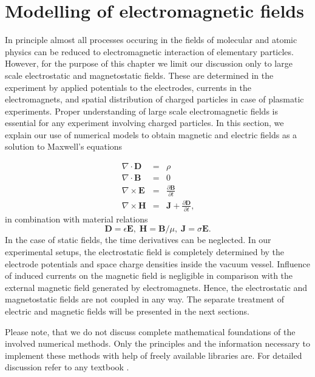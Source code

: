 
\chapter{Modelling of electromagnetic fields}

\label{ch:Modelling}In principle almost all processes occuring in
the fields of molecular and atomic physics can be reduced to electromagnetic
interaction of elementary particles. However, for the purpose of this
chapter we limit our discussion only to large scale electrostatic
and magnetostatic fields. These are determined in the experiment by
applied potentials to the electrodes, currents in the electromagnets,
and spatial distribution of charged particles in case of plasmatic
experiments. Proper understanding of large scale electromagnetic fields
is essential for any experiment involving charged particles. In this
section, we explain our use of numerical models to obtain magnetic
and electric fields as a solution to Maxwell's equations

\begin{eqnarray}
\nabla\cdot\mathbold{D} & = & \rho\\
\nabla\cdot\mathbold{B} & = & 0\\
\nabla\times\mathbold{E} & = & \frac{\partial\mathbold{B}}{\partial t}\\
\nabla\times\mathbold{H} & = & \mathbold{J}+\frac{\partial\mathbold{D}}{\partial t}\text{{,}}
\label{eq:sim:maxwell}
\end{eqnarray}
in combination with material relations
\begin{equation}
\mathbold{D}=\epsilon\mathbold{E},\;\mathbold{H}=\mathbold{B}/\mu,\;\mathbold{J}=\sigma\mathbold{E}\text{.}
\label{eq:sim:materials}
\end{equation}
In the case of static fields, the time derivatives can be neglected.
In our experimental setups, the electrostatic field is completely
determined by the electrode potentials and space charge densities
inside the vacuum vessel. Influence of induced currents on the magnetic
field is negligible in comparison with the external magnetic field
generated by electromagnets. Hence, the electrostatic and magnetostatic
fields are not coupled in any way. The separate treatment of electric
and magnetic fields will be presented in the next sections. 

Please note, that we do not discuss complete mathematical foundations of the involved numerical methods. Only the principles and the 
information necessary to implement these methods with help of
freely available libraries are. For detailed discussion refer to any 
textbook \cite{fenicsbook}.


